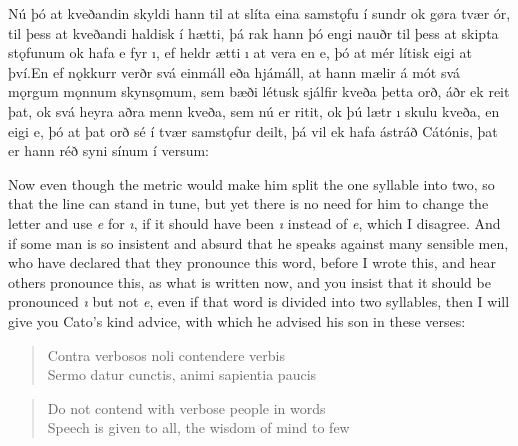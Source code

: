 \begin{paracol}{2}
    Nú þó at kveðandin skyldi hann til at slíta eina samstǫfu í sundr ok gøra tvær ór, til þess at kveðandi haldisk í hætti, þá rak hann þó engi nauðr til þess at skipta stǫfunum ok hafa e fyr ı, ef heldr ætti ı at vera en e, þó at mér lítisk eigi at því.\footnotemark En ef nǫkkurr verðr svá einmáll eða hjámáll, at hann mælir á mót svá mǫrgum mǫnnum skynsǫmum, sem bæði létusk sjálfir kveða þetta orð, áðr ek reit þat, ok svá heyra aðra menn kveða, sem nú er ritit, ok þú lætr ı skulu kveða, en eigi e, þó at þat orð sé í tvær samstǫfur deilt, þá vil ek hafa ástráð Cátónis, þat er hann réð syni sínum í versum:

    \switchcolumn
    Now even though the metric would make him split the one syllable into two, so that the line can stand in tune, but yet there is no need for him to change the letter and use \textit{e} for \textit{ı}, if it should have been \textit{ı} instead of \textit{e}, which I disagree. And if some man is so insistent and absurd that he speaks against many sensible men, who have declared that they pronounce this word, before I wrote this, and hear others pronounce this, as what is written now, and you insist that it should be pronounced \textit{ı} but not \textit{e}, even if that word is divided into two syllables, then I will give you Cato's kind advice, with which he advised his son in these verses:

    \switchcolumn*

    \begin{quote}
        Contra verbosos noli contendere verbis\\
        Sermo datur cunctis, animi sapientia paucis
    \end{quote}

    \switchcolumn

    \begin{quote}
        Do not contend with verbose people in words\\ Speech is given to all, the wisdom of mind to few
    \end{quote}

\end{paracol}
